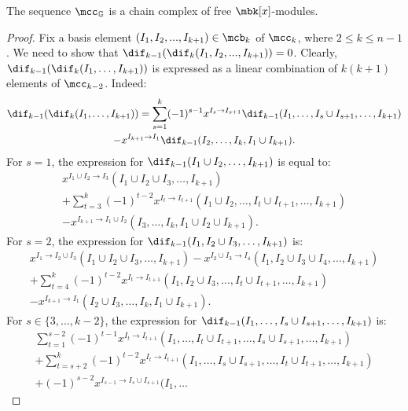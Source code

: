 \begin{proposition}\label{chain-complex}
The sequence $\mcc_{\mathbb{G}}$ is a chain complex of free
$\mbk[x]$-modules.
\end{proposition}
\begin{proof}
Fix a basis element $(I_1,I_2,...,I_{k+1})\in \mcb_k$ of $\mcc_k$,
where $2\leq k\leq n-1$.  We need to show that
$\dif_{k-1}(\dif_{k}(I_{1} ,I_{2},...,I_{k+1}))=0$.  Clearly,
$\dif_{k-1}(\dif_{k}(I_1,\ldots,I_{k+1}))$ is expressed as a linear
combination of $k(k+1)$ elements of $\mcc_{k-2}$. Indeed:
\begin{multline}\label{dd}
\dif_{k-1}(\dif_{k}(I_1,\ldots,I_{k+1}))=   \sum_{s=1}^{k}(-1)^{s-1}x^{I_s\to I_{s+1}}\dif_{k-1}(I_1,\ldots
  ,I_s\cup I_{s+1},\ldots ,I_{k+1}) \\  -x^{I_{k+1}\to
    I_1}\dif_{k-1}(I_2,\ldots,I_{k},I_1\cup I_{k+1}).
\end{multline}
For $s=1$, the expression for $\dif_{k-1}(I_1\cup
I_2,\ldots ,I_{k+1})$ is equal to:
\begin{multline}\label{s=1}
 x^{I_1\cup I_2\to I_3}(I_1\cup I_2\cup I_3,\ldots ,I_{k+1})\\+
  \sum_{t=3}^{k}(-1)^{t-2}x^{I_t\to I_{t+1}}(I_1\cup I_2,\ldots
  ,I_t\cup I_{t+1},\ldots ,I_{k+1}) \\-x^{I_{k+1}\to
    I_{1}\cup I_2}(I_3,\ldots ,I_{k},I_1\cup I_2\cup I_{k+1}). 
\end{multline}
For $s=2$, the expression for $\dif_{k-1}(I_1, I_2\cup I_3,\ldots
,I_{k+1})$ is:
\begin{multline}\label{s=2}
x^{I_1\to I_2\cup I_3}(I_1\cup I_2\cup I_3,\ldots ,I_{k+1}) -x^{I_2\cup I_3\to I_4}(I_1,I_2\cup I_3\cup I_4,\ldots,I_{k+1})  \\ + \sum_{t=4}^{k}(-1)^{t-2}x^{I_t\to I_{t+1}}(I_1,I_2\cup
  I_3,\ldots ,I_t\cup I_{t+1},\ldots ,I_{k+1}) \\
  -x^{I_{k+1}\to I_{1}}(I_2\cup I_3,\ldots ,I_{k},I_1\cup
  I_{k+1}).
\end{multline}
For $s\in\{3,\ldots ,k-2\}$, the expression for $\dif_{k-1}(I_1,\ldots
,I_s\cup I_{s+1},\ldots ,I_{k+1})$ is:
\begin{multline}\label{s=3tok-2}
\sum_{t=1}^{s-2}(-1)^{t-1}x^{I_t\to I_{t+1}}(I_1,\ldots ,I_t\cup
  I_{t+1},\ldots , I_s\cup I_{s+1},\ldots ,I_{k+1})
  \\+\sum_{t=s+2}^{k}(-1)^{t-2}x^{I_t\to I_{t+1}}(I_1,\ldots
  ,I_s\cup I_{s+1},\ldots , I_t\cup I_{t+1},\ldots ,I_{k+1})
  \\+(-1)^{s-2}x^{I_{s-1}\to I_{s}\cup I_{s+1}}(I_1,\ldots

\end{multline}
\end{proof}
